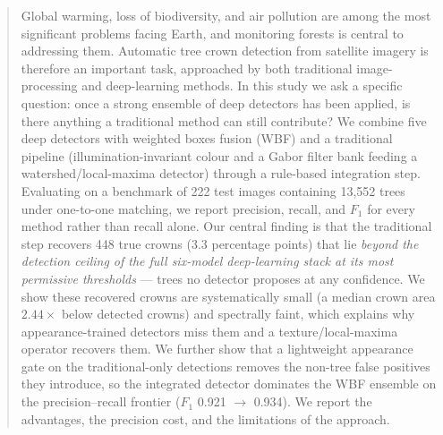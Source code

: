 \begin{abstract}
Global warming, loss of biodiversity, and air pollution are among the most
significant problems facing Earth, and monitoring forests is central to
addressing them. Automatic tree crown detection from satellite imagery is
therefore an important task, approached by both traditional image-processing
and deep-learning methods. In this study we ask a specific question: once a
strong ensemble of deep detectors has been applied, is there anything a
traditional method can still contribute? We combine five deep detectors with
weighted boxes fusion (WBF) and a traditional pipeline (illumination-invariant
colour and a Gabor filter bank feeding a watershed/local-maxima detector)
through a rule-based integration step. Evaluating on a benchmark of 222 test
images containing 13{,}552 trees under one-to-one matching, we report precision,
recall, and $F_1$ for every method rather than recall alone. Our central
finding is that the traditional step recovers 448 true crowns (3.3 percentage
points) that lie \emph{beyond the detection ceiling of the full six-model
deep-learning stack at its most permissive thresholds} --- trees no detector
proposes at any confidence. We show these recovered crowns are systematically
small (a median crown area $2.44\times$ below detected crowns) and spectrally
faint, which explains why appearance-trained detectors miss them and a
texture/local-maxima operator recovers them. We further show that a lightweight
appearance gate on the traditional-only detections removes the non-tree
false positives they introduce, so the integrated detector dominates the WBF
ensemble on the precision--recall frontier ($F_1$ 0.921 $\rightarrow$ 0.934).
We report the advantages, the precision cost, and the limitations of the
approach.
\end{abstract}


